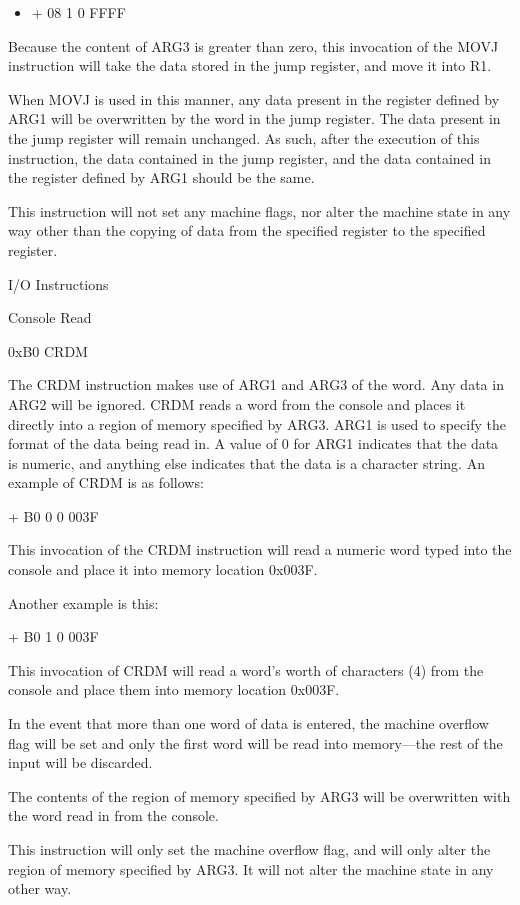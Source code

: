 \documentclass[]{article}
\providecommand{\tightlist}{%
  \setlength{\itemsep}{0pt}\setlength{\parskip}{0pt}}
\begin{document}
\begin{itemize}
\tightlist
\item
  + 08 1 0 FFFF
\end{itemize}

Because the content of ARG3 is greater than zero, this invocation of the
MOVJ instruction will take the data stored in the jump register, and
move it into R1.

When MOVJ is used in this manner, any data present in the register
defined by ARG1 will be overwritten by the word in the jump register.
The data present in the jump register will remain unchanged. As such,
after the execution of this instruction, the data contained in the jump
register, and the data contained in the register defined by ARG1 should
be the same.

This instruction will not set any machine flags, nor alter the machine
state in any way other than the copying of data from the specified
register to the specified register.

I/O Instructions

Console Read

0xB0 CRDM

The CRDM instruction makes use of ARG1 and ARG3 of the word. Any data in
ARG2 will be ignored. CRDM reads a word from the console and places it
directly into a region of memory specified by ARG3. ARG1 is used to
specify the format of the data being read in. A value of 0 for ARG1
indicates that the data is numeric, and anything else indicates that the
data is a character string. An example of CRDM is as follows:

+ B0 0 0 003F

This invocation of the CRDM instruction will read a numeric word typed
into the console and place it into memory location 0x003F.~

Another example is this:

+ B0 1 0 003F

This invocation of CRDM will read a word's worth of characters (4) from
the console and place them into memory location 0x003F.

In the event that more than one word of data is entered, the machine
overflow flag will be set and only the first word will be read into
memory---the rest of the input will be discarded.

The contents of the region of memory specified by ARG3 will be
overwritten with the word read in from the console.

This instruction will only set the machine overflow flag, and will only
alter the region of memory specified by ARG3. It will not alter the
machine state in any other way.
\end{document}
